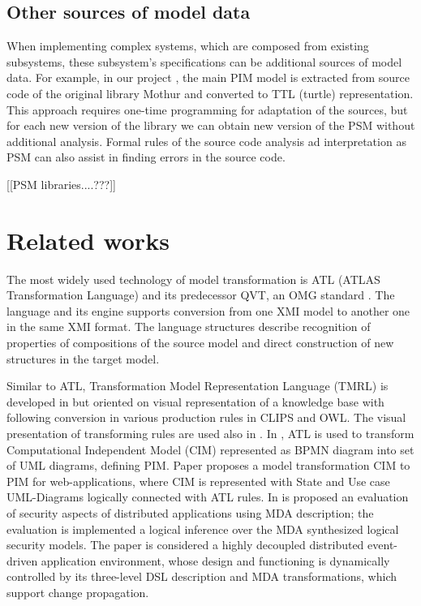 \documentclass[conference]{IEEEtran}
\begin{document}

\subsection{Other sources of model data}
\label{sec:other-models}

When implementing complex systems, which are composed from existing subsystems, these subsystem's specifications can be additional sources of model data.  For example, in our project \cite{bit2019}, the main PIM model is extracted from source code of the original library Mothur and converted to TTL (turtle) representation.  This approach requires one-time programming for adaptation of the sources, but for each new version of the library we can obtain new version of the PSM without additional analysis.  Formal rules of the source code analysis ad interpretation as PSM can also assist in finding errors in the source code.

[[PSM libraries....???]]


\section{Related works}

The most widely used technology of model transformation is ATL (ATLAS Transformation Language) \cite{atl} and its predecessor QVT, an OMG standard \cite{QVT}.  The language and its engine supports conversion from one XMI model to another one in the same XMI format.  The language structures describe recognition of properties of compositions of the source model and direct construction of new structures in the target model.

Similar to ATL, Transformation Model Representation Language (TMRL) is developed in \cite{nikita} but oriented on visual representation of a knowledge base with following conversion in various production rules in CLIPS and OWL.  The visual presentation of transforming rules are used also in \cite{GT}.  In \cite{azis}, ATL is used to transform Computational Independent Model (CIM) represented as BPMN diagram into set of UML diagrams, defining PIM. Paper \cite{Rhazali} proposes a model transformation CIM to PIM for web-applications, where CIM is represented with State and Use case UML-Diagrams logically connected with ATL rules.  In \cite{Hamid} is proposed an evaluation of security aspects of distributed applications using MDA description; the evaluation is implemented a logical inference over the MDA synthesized logical security models. The paper \cite{Zdun} is considered a highly decoupled distributed event-driven application environment, whose design and functioning is dynamically controlled by its three-level DSL description and MDA transformations, which support change propagation.
\end{document}
